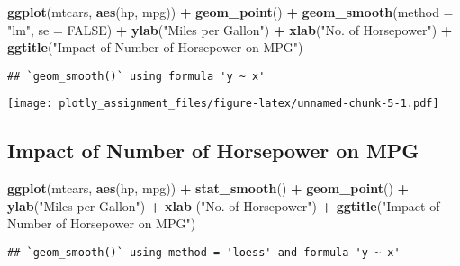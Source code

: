 \documentclass[]{article}
\newenvironment{Shaded}{\begin{snugshade}}{\end{snugshade}}
\newcommand{\DataTypeTok}[1]{\textcolor[rgb]{0.13,0.29,0.53}{#1}}
\newcommand{\KeywordTok}[1]{\textcolor[rgb]{0.13,0.29,0.53}{\textbf{#1}}}
\newcommand{\NormalTok}[1]{#1}
\newcommand{\OperatorTok}[1]{\textcolor[rgb]{0.81,0.36,0.00}{\textbf{#1}}}
\newcommand{\OtherTok}[1]{\textcolor[rgb]{0.56,0.35,0.01}{#1}}
\newcommand{\StringTok}[1]{\textcolor[rgb]{0.31,0.60,0.02}{#1}}
\begin{document}
\begin{Shaded}
\begin{Highlighting}[]
\KeywordTok{ggplot}\NormalTok{(mtcars, }\KeywordTok{aes}\NormalTok{(hp, mpg)) }\OperatorTok{+}\StringTok{ }\KeywordTok{geom_point}\NormalTok{() }\OperatorTok{+}
\StringTok{  }\KeywordTok{geom_smooth}\NormalTok{(}\DataTypeTok{method =} \StringTok{"lm"}\NormalTok{, }\DataTypeTok{se =} \OtherTok{FALSE}\NormalTok{) }\OperatorTok{+}
\StringTok{  }\KeywordTok{ylab}\NormalTok{(}\StringTok{"Miles per Gallon"}\NormalTok{) }\OperatorTok{+}
\StringTok{  }\KeywordTok{xlab}\NormalTok{(}\StringTok{"No. of Horsepower"}\NormalTok{) }\OperatorTok{+}
\StringTok{  }\KeywordTok{ggtitle}\NormalTok{(}\StringTok{"Impact of Number of Horsepower on MPG"}\NormalTok{)}
\end{Highlighting}
\end{Shaded}

\begin{verbatim}
## `geom_smooth()` using formula 'y ~ x'
\end{verbatim}

\texttt{[image: plotly\_assignment\_files/figure-latex/unnamed-chunk-5-1.pdf]}

\hypertarget{impact-of-number-of-horsepower-on-mpg}{%
\subsection{Impact of Number of Horsepower on
MPG}\label{impact-of-number-of-horsepower-on-mpg}}

\begin{Shaded}
\begin{Highlighting}[]
\KeywordTok{ggplot}\NormalTok{(mtcars, }\KeywordTok{aes}\NormalTok{(hp, mpg)) }\OperatorTok{+}
\StringTok{  }\KeywordTok{stat_smooth}\NormalTok{() }\OperatorTok{+}\StringTok{ }\KeywordTok{geom_point}\NormalTok{() }\OperatorTok{+}
\StringTok{  }\KeywordTok{ylab}\NormalTok{(}\StringTok{"Miles per Gallon"}\NormalTok{) }\OperatorTok{+}
\StringTok{  }\KeywordTok{xlab}\NormalTok{ (}\StringTok{"No. of Horsepower"}\NormalTok{) }\OperatorTok{+}
\StringTok{  }\KeywordTok{ggtitle}\NormalTok{(}\StringTok{"Impact of Number of Horsepower on MPG"}\NormalTok{)}
\end{Highlighting}
\end{Shaded}

\begin{verbatim}
## `geom_smooth()` using method = 'loess' and formula 'y ~ x'
\end{verbatim}
\end{document}
